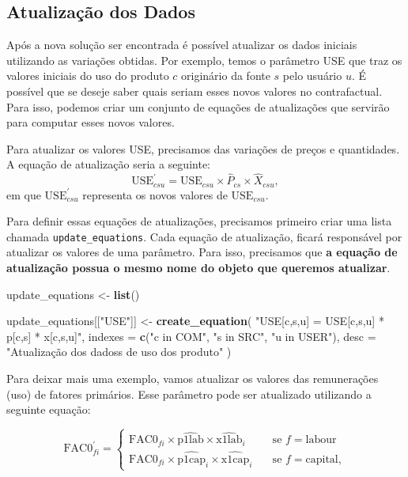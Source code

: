 \documentclass[12pt,twoside]{article}
\newenvironment{Shaded}{\begin{snugshade}}{\end{snugshade}}
\newcommand{\DataTypeTok}[1]{\textcolor[rgb]{0.13,0.29,0.53}{#1}}
\newcommand{\KeywordTok}[1]{\textcolor[rgb]{0.13,0.29,0.53}{\textbf{#1}}}
\newcommand{\NormalTok}[1]{#1}
\newcommand{\StringTok}[1]{\textcolor[rgb]{0.31,0.60,0.02}{#1}}
\let\oldShaded\Shaded
\let\endoldShaded\endShaded
\renewenvironment{Shaded}{\footnotesize\oldShaded}{\endoldShaded}
\begin{document}
\hypertarget{atualizauxe7uxe3o-dos-dados}{%
\subsection{Atualização dos Dados}\label{atualizauxe7uxe3o-dos-dados}}

Após a nova solução ser encontrada é possível atualizar os dados
iniciais utilizando as variações obtidas. Por exemplo, temos o parâmetro
USE que traz os valores iniciais do uso do produto \(c\) originário da
fonte \(s\) pelo usuário \(u\). É possível que se deseje saber quais
seriam esses novos valores no contrafactual. Para isso, podemos criar um
conjunto de equações de atualizações que servirão para computar esses
novos valores.

Para atualizar os valores USE, precisamos das variações de preços e
quantidades. A equação de atualização seria a seguinte:
\[ \text{USE}^\prime_{csu} = \text{USE}_{csu} \times \hat{P}_{cs}\times \hat{X}_{csu},\]
em que \(\text{USE}^\prime_{csu}\) representa os novos valores de
\(\text{USE}_{csu}\).

Para definir essas equações de atualizações, precisamos primeiro criar
uma lista chamada \texttt{update\_equations}. Cada equação de
atualização, ficará responsável por atualizar os valores de uma
parâmetro. Para isso, precisamos que \textbf{a equação de atualização
possua o mesmo nome do objeto que queremos atualizar}.

\begin{Shaded}
\begin{Highlighting}[]
\NormalTok{update_equations <-}\StringTok{ }\KeywordTok{list}\NormalTok{()}

\NormalTok{update_equations[[}\StringTok{"USE"}\NormalTok{]] <-}\StringTok{ }\KeywordTok{create_equation}\NormalTok{(}
  \StringTok{"USE[c,s,u] = USE[c,s,u] * p[c,s] * x[c,s,u]"}\NormalTok{,}
  \DataTypeTok{indexes =} \KeywordTok{c}\NormalTok{(}\StringTok{"c in COM"}\NormalTok{, }\StringTok{"s in SRC"}\NormalTok{, }\StringTok{"u in USER"}\NormalTok{),}
  \DataTypeTok{desc =} \StringTok{"Atualização dos dadoss de uso dos produto"}
\NormalTok{)}
\end{Highlighting}
\end{Shaded}

Para deixar mais uma exemplo, vamos atualizar os valores das
remunerações (uso) de fatores primários. Esse parâmetro pode ser
atualizado utilizando a seguinte equação:

\[
\text{FAC0}^\prime_{fi} =
\begin{cases}
\text{FAC0}_{fi} \times \hat{\text{p1lab}} \times \hat{\text{x1lab}}_i       & \quad \text{se } f = \text{labour}\\
\text{FAC0}_{fi} \times \hat{\text{p1cap}}_i \times \hat{\text{x1cap}}_i       & \quad \text{se } f = \text{capital},
\end{cases}
\]
\end{document}
